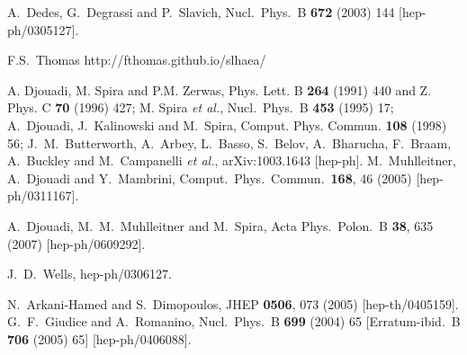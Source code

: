 \documentclass[final,3p,11pt,pdflatex]{elsarticle}
\begin{document}
\begin{thebibliography}{100}
  A.~Dedes, G.~Degrassi and P.~Slavich,
  Nucl.\ Phys.\ B {\bf 672} (2003) 144
  [hep-ph/0305127].

 F.S.~Thomas http://fthomas.github.io/slhaea/

  A. Djouadi, M. Spira and P.M. Zerwas, Phys. Lett.  B {\bf 264}
(1991) 440 and  Z. Phys. C {\bf 70} (1996) 427;  M. Spira {\it et al.}, Nucl.\
Phys.\ B {\bf 453} (1995) 17;  A.~Djouadi, J.~Kalinowski and M.~Spira, Comput.
Phys. Commun. {\bf 108} (1998) 56; J.~M.~Butterworth, A.~Arbey, L.~Basso, S.~Belov, A.~Bharucha, F.~Braam, A.~Buckley and M.~Campanelli {\it et al.},
  arXiv:1003.1643 [hep-ph].
  M.~Muhlleitner, A.~Djouadi and Y.~Mambrini,
  Comput.\ Phys.\ Commun.\  {\bf 168}, 46 (2005)
  [hep-ph/0311167].


  A.~Djouadi, M.~M.~Muhlleitner and M.~Spira,
  Acta Phys.\ Polon.\ B {\bf 38}, 635 (2007)
  [hep-ph/0609292].

  J.~D.~Wells,
  hep-ph/0306127.

  N.~Arkani-Hamed and S.~Dimopoulos,
  JHEP {\bf 0506}, 073 (2005)
  [hep-th/0405159].
  G.~F.~Giudice and A.~Romanino,
  Nucl.\ Phys.\ B {\bf 699} (2004) 65
   [Erratum-ibid.\ B {\bf 706} (2005) 65]
  [hep-ph/0406088].


\end{thebibliography}
\end{document}
